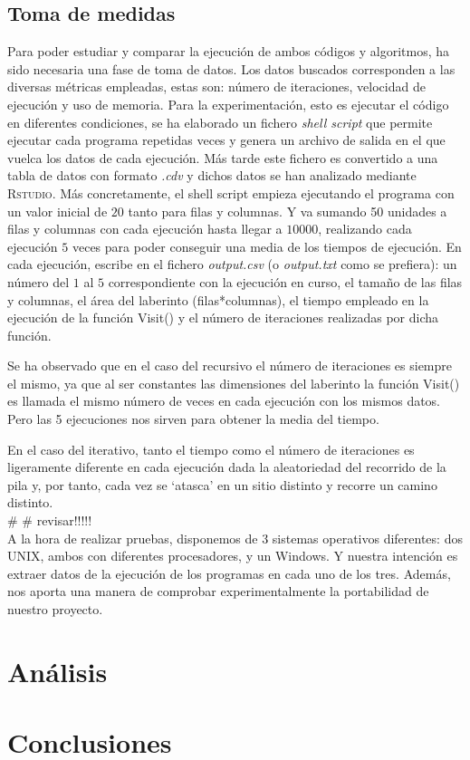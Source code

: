 \documentclass[12pt,a4paper]{article}
\begin{document}
\subsection{Toma de medidas}
Para poder estudiar y comparar la ejecución de ambos códigos y algoritmos, ha sido necesaria una fase de toma de datos. Los datos buscados corresponden a las diversas métricas empleadas, estas son: número de iteraciones, velocidad de ejecución y uso de memoria. Para la experimentación, esto es ejecutar el código en diferentes condiciones, se ha elaborado un fichero \textit{shell script} que permite ejecutar cada programa repetidas veces y genera un archivo de salida en el que vuelca los datos de cada ejecución. Más tarde este fichero es convertido a una tabla de datos con formato \textit{.cdv} y dichos datos se han analizado mediante \textsc{Rstudio}. 
\vspace{0.3cm}
Más concretamente, el shell script empieza ejecutando el programa con un valor inicial de $20$ tanto para filas y columnas. Y va sumando 50 unidades a filas y columnas con cada ejecución hasta llegar a $10000$, realizando cada ejecución $5$ veces para poder conseguir una media de los tiempos de ejecución. En cada ejecución, escribe en el fichero \textit{output.csv} (o \textit{output.txt} como se prefiera): un número del $1$ al $5$ correspondiente con la ejecución en curso, el tamaño de las filas y columnas, el área del laberinto (filas*columnas), el tiempo empleado en la ejecución de la función \textsf{Visit()} y el número de iteraciones realizadas por dicha función. 

Se ha observado que en el caso del recursivo el número de iteraciones es siempre el mismo, ya que al ser constantes las dimensiones del laberinto la función \textsf{Visit()} es llamada el mismo número de veces en cada ejecución con los mismos datos. Pero las 5 ejecuciones nos sirven para obtener la media del tiempo.  

En el caso del iterativo, tanto el tiempo como el número de iteraciones es ligeramente diferente en cada ejecución dada la aleatoriedad del recorrido de la pila y, por tanto, cada vez se ‘atasca’ en un sitio distinto y recorre un camino distinto.\\

 \# \# revisar!!!!!\\

A la hora de realizar pruebas, disponemos de 3 sistemas operativos diferentes: dos UNIX, ambos con diferentes procesadores, y un Windows. Y nuestra intención es extraer datos de la ejecución de los programas en cada uno de los tres. Además, nos aporta una manera de comprobar experimentalmente la portabilidad de nuestro proyecto.  

\section{Análisis}

\clearpage
\section{Conclusiones}

\clearpage


\end{document}
